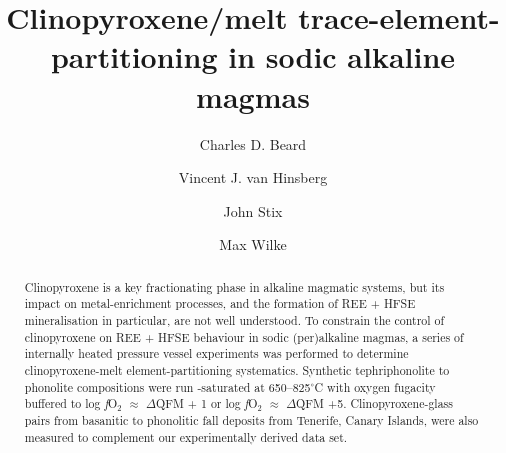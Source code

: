 \documentclass[review,authoryear,12pt]{elsarticle}
\newcommand{\dgC}{$^\circ$C }
\newcommand{\fO}{\textit{f}O$_{2}$ }
\begin{document}
\begin{frontmatter}


%

\title{Clinopyroxene/melt trace-element-partitioning in sodic alkaline magmas}


\author[1,2]{Charles D. Beard}

\author[2]{Vincent J. van Hinsberg}
\author[2]{John Stix}
\author[3,4]{Max Wilke}

\address[1]{British Geological Survey, The Lyell Centre, Research Avenue South, Edinburgh, EH14 4AP, UK}
\address[2]{Earth and Planetary Sciences, McGill University, 3450 University Street, Montreal, Qu\'ebec, H3A 0E8, Canada}
\address[3]{Institut f\"ur Erd- und Umweltwissenschaften, Universit\"at Potsdam, Golm, Germany}
\address[4]{Chemie und Physik der Geomaterialien, Deutsches GeoForschungsZentrum GFZ, Potsdam, Germany}



\begin{abstract}
Clinopyroxene is a key fractionating phase in alkaline magmatic systems,
but its impact on metal-enrichment processes, and the formation of REE + HFSE mineralisation in particular, are not well understood.
To constrain the control of clinopyroxene on REE + HFSE behaviour in sodic (per)alkaline magmas, a series of internally heated pressure vessel experiments was performed to determine clinopyroxene-melt element-partitioning systematics. Synthetic tephriphonolite to phonolite compositions were run -saturated at 650--825\dgC with oxygen fugacity buffered to log \fO $\approx$ $\Delta$QFM + 1 or log \fO $\approx$ $\Delta$QFM +5. Clinopyroxene-glass pairs from basanitic to phonolitic fall deposits from Tenerife, Canary Islands, were also measured to complement our experimentally derived data set.


\end{abstract}
\end{frontmatter}
\end{document}

